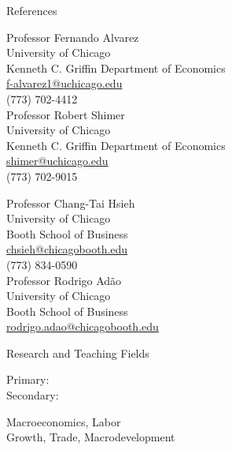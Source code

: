 \documentclass{resume} %
\begin{document}

	\begin{rSection}{References}
		\begin{minipage}[t]{0.5\textwidth}
				Professor Fernando Alvarez\\
				University of Chicago\\
				Kenneth C. Griffin Department of Economics\\
				\href{mailto:f-alvarez1@uchicago.edu}{f-alvarez1@uchicago.edu}\\
				(773) 702-4412\\

				Professor Robert Shimer\\
				University of Chicago\\
				Kenneth C. Griffin Department of Economics\\
				\href{mailto:shimer@uchicago.edu}{shimer@uchicago.edu}\\
				(773) 702-9015
		\end{minipage}
		\begin{minipage}[t]{0.5\textwidth}
				Professor Chang-Tai Hsieh\\
				University of Chicago\\
				Booth School of Business\\
				\href{mailto:chsieh@chicagobooth.edu}{chsieh@chicagobooth.edu}\\
				(773) 834-0590\\

				Professor Rodrigo Adão\\
				University of Chicago\\
				Booth School of Business\\
				\href{mailto:rodrigo.adao@chicagobooth.edu}{rodrigo.adao@chicagobooth.edu}
		\end{minipage}
	\end{rSection}

	\begin{rSection}{Research and Teaching Fields}
		\begin{minipage}[t]{0.15\textwidth}
			Primary:\\
			Secondary:
		\end{minipage}
		\begin{minipage}[t]{0.85\textwidth}
				Macroeconomics, Labor\\
				Growth, Trade, Macrodevelopment
		\end{minipage}
	\end{rSection}
\end{document}
